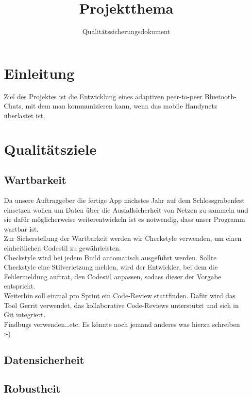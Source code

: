 \documentclass[accentcolor=tud0b,12pt,paper=a4]{tudreport}
\title{Projektthema}
\subtitle{Qualitätssicherungsdokument}
\begin{document}
	\maketitle
	\tableofcontents 
	
	\chapter{Einleitung}
        Ziel des Projektes ist die Entwicklung eines adaptiven peer-to-peer Bluetooth-Chats, mit dem man kommunizieren kann, wenn das mobile Handynetz überlastet ist.
	
	\chapter{Qualitätsziele}
        \section{Wartbarkeit}
    
		Da unsere Auftraggeber die fertige App nächstes Jahr auf dem Schlossgrabenfest einsetzen wollen um Daten über die Ausfallsicherheit von Netzen zu sammeln und sie dafür möglicherweise weiterentwickeln ist es notwendig, dass unser Programm wartbar ist.\\

		Zur Sicherstellung der Wartbarkeit werden wir Checkstyle verwenden, um einen einheitlichen Codestil zu gewährleisten.\\
                Checkstyle wird bei jedem Build automatisch ausgeführt werden. Sollte Checkstyle eine Stilverletzung melden, wird der Entwickler, bei dem die Fehlermeldung auftrat, den Codestil anpassen, sodass dieser der Vorgabe entspricht.\\

                Weiterhin soll einmal pro Sprint ein Code-Review stattfinden. Dafür wird das Tool Gerrit verwendet, das kollaborative Code-Reviews unterstützt und sich in Git integriert.\\

                Findbugs verwenden\ldots etc. Es könnte noch jemand anderes was hierzu schreiben :-)

        \section{Datensicherheit}

        \section{Robustheit}
\end{document}
